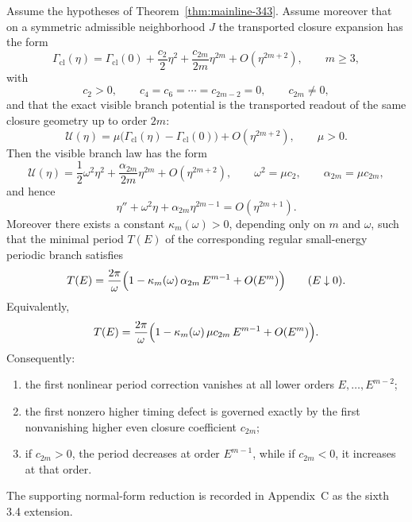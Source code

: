 \begin{theorem}
\label{thm:mainline-345}
Assume the hypotheses of Theorem~\ref{thm:mainline-343}. Assume moreover that on a symmetric admissible neighborhood $J$ the transported closure expansion has the form
\[
  \Gamma_{\mathrm{cl}}(\eta)
  =\Gamma_{\mathrm{cl}}(0)+\frac{c_2}{2}\eta^2+\frac{c_{2m}}{2m}\eta^{2m}+O(\eta^{2m+2}),
  \qquad m\ge 3,
\]
with
\[
  c_2>0,
  \qquad
  c_4=c_6=\cdots=c_{2m-2}=0,
  \qquad
  c_{2m}\neq 0,
\]
and that the exact visible branch potential is the transported readout of the same closure geometry up to order $2m$:
\[
  \mathcal U(\eta)=\mu\bigl(\Gamma_{\mathrm{cl}}(\eta)-\Gamma_{\mathrm{cl}}(0)\bigr)+O(\eta^{2m+2}),
  \qquad \mu>0.
\]
Then the visible branch law has the form
\[
  \mathcal U(\eta)=\frac12\omega^2\eta^2+\frac{\alpha_{2m}}{2m}\eta^{2m}+O(\eta^{2m+2}),
  \qquad
  \omega^2=\mu c_2,
  \qquad
  \alpha_{2m}=\mu c_{2m},
\]
and hence
\[
  \eta''+\omega^2\eta+\alpha_{2m}\eta^{2m-1}=O(\eta^{2m+1}).
\]
Moreover there exists a constant $\kappa_m(\omega)>0$, depending only on $m$ and $\omega$, such that the minimal period $T(E)$ of the corresponding regular small-energy periodic branch satisfies
\[
  T(E)=\frac{2\pi}{\omega}\Bigl(1-\kappa_m(\omega)\,\alpha_{2m}\,E^{m-1}+O(E^m)\Bigr)
  \qquad (E\downarrow 0).
\]
Equivalently,
\[
  T(E)=\frac{2\pi}{\omega}\Bigl(1-\kappa_m(\omega)\,\mu c_{2m}\,E^{m-1}+O(E^m)\Bigr).
\]
Consequently:
\begin{enumerate}[label=(\roman*)]
  \item the first nonlinear period correction vanishes at all lower orders $E,\dots,E^{m-2}$;
  \item the first nonzero higher timing defect is governed exactly by the first nonvanishing higher even closure coefficient $c_{2m}$;
  \item if $c_{2m}>0$, the period decreases at order $E^{m-1}$, while if $c_{2m}<0$, it increases at that order.
\end{enumerate}
The supporting normal-form reduction is recorded in Appendix~C as the sixth 3.4 extension.
\end{theorem}

